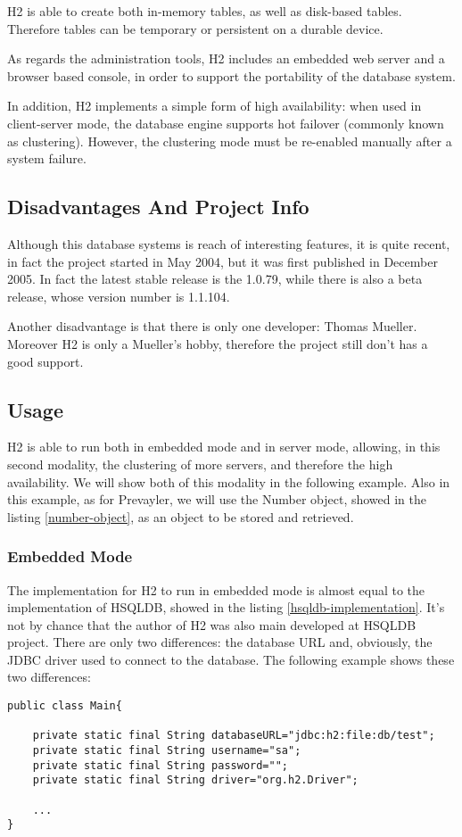 H2 is able to create both in-memory tables, as well as disk-based tables. Therefore tables can be temporary or persistent on a durable device. 

As regards the administration tools, H2 includes an embedded web server and a browser based console, in order to support the portability of the database system.

In addition, H2 implements a simple form of high availability: when used in client-server mode, the database engine supports hot failover (commonly known as clustering). However, the clustering mode must be re-enabled manually after a system failure.

			\subsection{Disadvantages And Project Info}
Although this database systems is reach of interesting features, it is quite recent, in fact the project started in May 2004, but it was first published in December 2005. In fact the latest stable release is the 1.0.79, while there is also a beta release, whose version number is 1.1.104. 

Another disadvantage is that there is only one developer: Thomas Mueller. Moreover H2 is only a Mueller's hobby, therefore the project still don't has a good support. 

			\subsection{Usage}
H2 is able to run both in embedded mode and in server mode, allowing, in this second modality, the clustering of more servers, and therefore the high availability. We will show both of this modality in the following example. Also in this example, as for Prevayler, we will use the Number object, showed in the listing \ref{number-object}, as an object to be stored and retrieved.

				\subsubsection{Embedded Mode}
The implementation for H2 to run in embedded mode is almost equal to the implementation of HSQLDB, showed in the listing \ref{hsqldb-implementation}. It's not by chance that the author of H2 was also main developed at HSQLDB project. There are only two differences: the database URL and, obviously, the JDBC driver used to connect to the database. The following example shows these two differences:
\begin{lstlisting}
public class Main{
	
    private static final String databaseURL="jdbc:h2:file:db/test";
    private static final String username="sa";
    private static final String password="";
    private static final String driver="org.h2.Driver";

    ...
}
\end{lstlisting}
								
